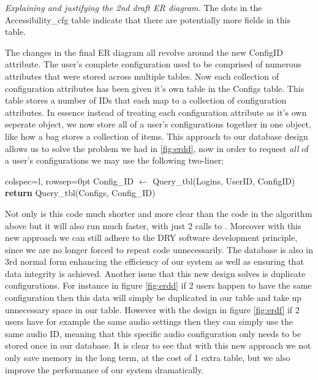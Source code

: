 \textit{Explaining and justifying the 2nd draft ER diagram.}
The dots in the {\sffamily Accessibility\_cfg} table indicate
that there are potentially more fields in this table. \\ \vspace{0.2cm}

The changes in the final ER diagram all revolve around the new
ConfigID attribute. The user's complete configuration used to 
be comprised of numerous attributes that were stored across
multiple tables. Now each collection of configuration
attributes has been given it's own table in the
{\sffamily Configs} table. This table stores a number of IDs
that each map to a collection of configuration attributes.
In essence instead of treating each configuration attribute as
it's own seperate object, we now store all of a user's 
configurations together in one object, like how a bag stores
a collection of items. This approach to our database design
allows us to solve the problem we had in \ref{fig:erdd}, now
in order to request \textit{all} of a user's configurations
we may use the following two-liner;\\

\begin{center}
\begin{tblr}{colspec={l}, rowsep=0pt}
  {\sffamily Config\_ID} $\gets$ {\sffamily Query\_tbl(Logins, UserID, ConfigID)}\\
  {\sffamily \textbf{return} Query\_tbl(Configs, Config\_ID)}\\
\end{tblr}
\end{center}

Not only is this code much shorter and more clear than the 
code in the algorithm above but it will also run much
faster, with just 2 calls to . Moreover
with this new approach we can still adhere to the DRY software
development principle, since we are no longer forced to repeat
code unnecessarily. The database is also in 3rd normal form
enhancing the efficiency of our system as 
well as ensuring that data integrity is achieved.
Another issue that this new design solves
is duplicate configurations. For instance in figure 
\ref{fig:erdd} if 2 users happen to have the same
configuration then this data will simply be duplicated in our 
table and take up unnecessary space in our table. However 
with the design in figure \ref{fig:erdf} if 2 users have for
example the same audio settings then they can simply use the
same audio ID, meaning that this specific audio configuration 
only needs to be stored once in our database. It is clear to 
see that with this new approach we not only save memory in 
the long term, at the cost of 1 extra table, but we also 
improve the performance of our system dramatically. \\
\vspace{0.2cm}


